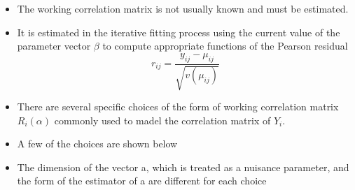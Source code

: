 \documentclass{beamer}
\begin{document}
\begin{frame}{}
\begin{itemize}
	\item The working correlation matrix is not usually known and must be estimated.
	\item It is estimated in the iterative fitting process using the current value of the parameter vector $\beta$ to compute appropriate functions of the Pearson residual
	\[r_{ij}=\frac{y_{ij}-\mu_{ij}}{\sqrt{v(\mu_{ij})}} \]
	\item There are several specific choices of the form of working correlation matrix $R_i(\alpha)$ commonly used to madel the correlation matrix of $Y_i$. 
	\item A few of the choices are shown below
	\item The dimension of the vector a, which is treated as a nuisance parameter, and the form of the estimator of a are different for each choice

\end{itemize}
\end{frame}
\end{document}
